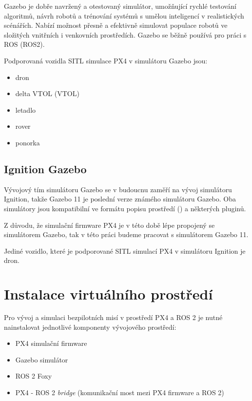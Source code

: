 Gazebo je dobře navržený a otestovaný simulátor, umožňující rychlé testování algoritmů, návrh robotů a trénování systémů s umělou inteligencí v realistických scénářích. Nabízí možnost přesně a efektivně simulovat populace robotů ve složitých vnitřních i venkovních prostředích. Gazebo se běžně používá pro práci s ROS (ROS2). \cite{GAZ}

Podporovaná vozidla \acs{SITL} simulace PX4 v simulátoru Gazebo jsou:

\begin{itemize}
    \item dron
    \item delta \acs{VTOL} (\acl{VTOL})
    \item letadlo
    \item rover
    \item ponorka
\end{itemize}

\subsection{Ignition Gazebo}

Vývojový tím simulátoru Gazebo se v budoucnu zaměří na vývoj simulátoru Ignition, takže Gazebo 11 je poslední verze známého simulátoru Gazebo. Oba simulátory jsou kompatibilní ve formátu popisu prostředí () a některých pluginů. \cite{IGN}

Z důvodu, že simulační firmware PX4 je v této době lépe propojený se simulátorem Gazebo, tak v této práci budeme pracovat s simulátorem Gazebo 11.

Jediné vozidlo, které je podporované \acs{SITL} simulací PX4 v simulátoru Ignition je dron.

\section{Instalace virtuálního prostředí}

Pro vývoj a simulaci bezpilotních misí v prostředí PX4 a ROS 2 je nutné nainstalovat jednotlivé komponenty vývojového prostředí:

\begin{itemize}
    \item PX4 simulační firmware
    \item Gazebo simulátor
    \item ROS 2 Foxy
    \item PX4 - ROS 2 \textit{bridge} (komunikační most mezi PX4 firmware a ROS 2)\\
\end{itemize}

